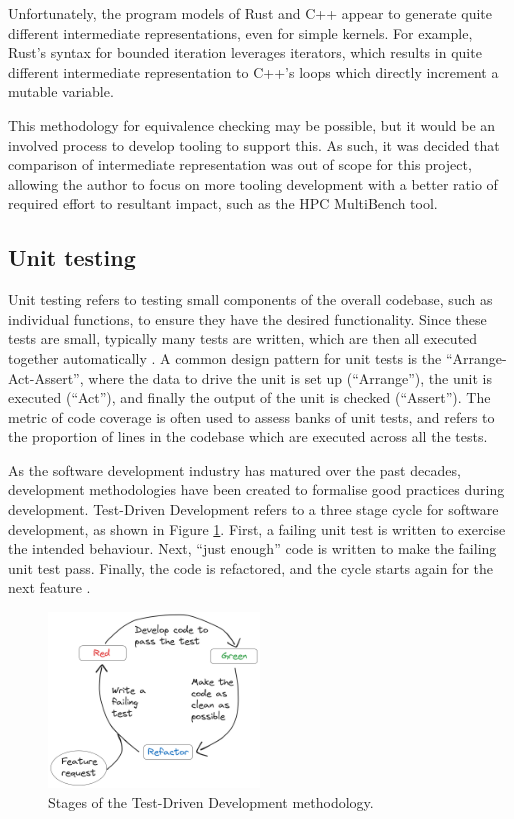 Unfortunately, the program models of Rust and C++ appear to generate quite different intermediate representations, even for simple kernels. For example, Rust's syntax for bounded iteration leverages iterators, which results in quite different intermediate representation to C++'s loops which directly increment a mutable variable.

This methodology for equivalence checking may be possible, but it would be an involved process to develop tooling to support this. As such, it was decided that comparison of intermediate representation was out of scope for this project, allowing the author to focus on more tooling development with a better ratio of required effort to resultant impact, such as the HPC MultiBench tool.

\subsection{Unit testing}
\label{ssec:equivalence-unit-testing}

Unit testing refers to testing small components of the overall codebase, such as individual functions, to ensure they have the desired functionality. Since these tests are small, typically many tests are written, which are then all executed together automatically \cite{archiveddocsTestEarlyOften2012}. A common design pattern for unit tests is the ``Arrange-Act-Assert'', where the data to drive the unit is set up (``Arrange''), the unit is executed (``Act''), and finally the output of the unit is checked (``Assert''). The metric of code coverage is often used to assess banks of unit tests, and refers to the proportion of lines in the codebase which are executed across all the tests.

As the software development industry has matured over the past decades, development methodologies have been created to formalise good practices during development. Test-Driven Development refers to a three stage cycle for software development, as shown in Figure \ref{fig:excalidraw_tdd}. First, a failing unit test is written to exercise the intended behaviour. Next, ``just enough'' code is written to make the failing unit test pass. Finally, the code is refactored, and the cycle starts again for the next feature \cite{beckTestDrivenDevelopment2022}.

\begin{figure}[H]
    \centering
    \includegraphics[width=0.5\textwidth]{images/3_translation/excalidraw_tdd.png}
    \caption{Stages of the Test-Driven Development methodology.}
    \label{fig:excalidraw_tdd}
\end{figure}

